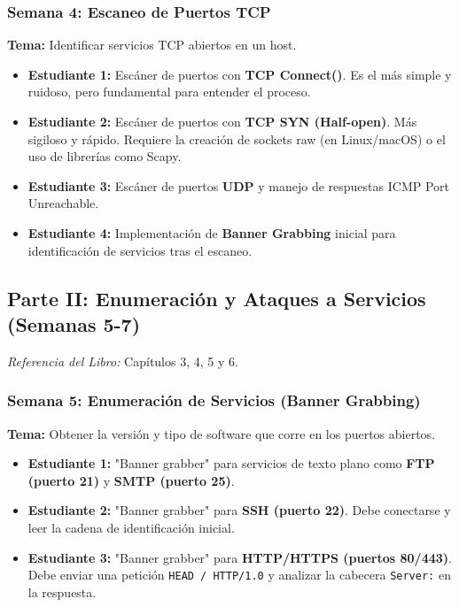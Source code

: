 \documentclass{article}
\begin{document}
\subsubsection*{Semana 4: Escaneo de Puertos TCP}
\textbf{Tema:} Identificar servicios TCP abiertos en un host.
\begin{itemize}
    \item \textbf{Estudiante 1:} Escáner de puertos con \textbf{TCP Connect()}. Es el más simple y ruidoso, pero fundamental para entender el proceso.
    \item \textbf{Estudiante 2:} Escáner de puertos con \textbf{TCP SYN (Half-open)}. Más sigiloso y rápido. Requiere la creación de sockets raw (en Linux/macOS) o el uso de librerías como Scapy.
    \item \textbf{Estudiante 3:} Escáner de puertos \textbf{UDP} y manejo de respuestas ICMP Port Unreachable.
    \item \textbf{Estudiante 4:} Implementación de \textbf{Banner Grabbing} inicial para identificación de servicios tras el escaneo.
\end{itemize}

\subsection*{Parte II: Enumeración y Ataques a Servicios (Semanas 5-7)}
\textit{Referencia del Libro:} Capítulos 3, 4, 5 y 6.

\subsubsection*{Semana 5: Enumeración de Servicios (Banner Grabbing)}
\textbf{Tema:} Obtener la versión y tipo de software que corre en los puertos abiertos.
\begin{itemize}
    \item \textbf{Estudiante 1:} "Banner grabber" para servicios de texto plano como \textbf{FTP (puerto 21)} y \textbf{SMTP (puerto 25)}.
    \item \textbf{Estudiante 2:} "Banner grabber" para \textbf{SSH (puerto 22)}. Debe conectarse y leer la cadena de identificación inicial.
    \item \textbf{Estudiante 3:} "Banner grabber" para \textbf{HTTP/HTTPS (puertos 80/443)}. Debe enviar una petición \texttt{HEAD / HTTP/1.0} y analizar la cabecera \texttt{Server:} en la respuesta.
\end{itemize}
\end{document}

